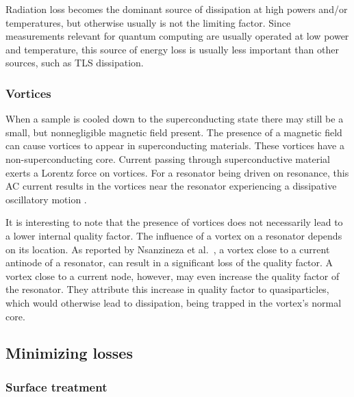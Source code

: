       Radiation loss becomes the dominant source of dissipation at high powers and/or temperatures, but otherwise usually is not the limiting factor. Since measurements relevant for quantum computing are usually operated at low power and temperature, this source of energy loss is usually less important than other sources, such as TLS dissipation.

    \subsubsection{Vortices}

      When a sample is cooled down to the superconducting state there may still be a small, but nonnegligible magnetic field present. The presence of a magnetic field can cause vortices to appear in superconducting materials. These vortices have a non-superconducting core. Current passing through superconductive material exerts a Lorentz force on vortices. For a resonator being driven on resonance, this AC current results in the vortices near the resonator experiencing a dissipative oscillatory motion \cite{plourde2009microwave}.

      It is interesting to note that the presence of vortices does not necessarily lead to a lower internal quality factor. The influence of a vortex on a resonator depends on its location. As reported by Nsanzineza et al.~\cite{nsanzineza2014trapping}, a vortex close to a current antinode of a resonator, can result in a significant loss of the quality factor. A vortex close to a current node, however, may even increase the quality factor of the resonator. They attribute this increase in quality factor to quasiparticles, which would otherwise lead to dissipation, being trapped in the vortex's normal core.





  \subsection{Minimizing losses}

  \subsubsection{Surface treatment}

